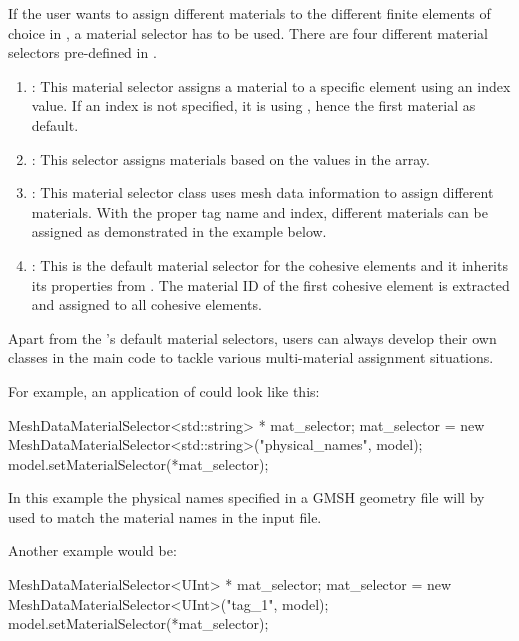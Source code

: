 If the user wants to assign different materials to the different
finite elements of choice in \akantu, a material selector has to be
used. There are four different material selectors pre-defined in
\akantu.

\begin{enumerate}
\item {}: This material selector assigns a
  material to a specific element using an index value. If an index is
  not specified, it is using , hence the first material as
  default.
\item {}: This selector assigns materials
  based on the values in the 
  array.
\item {}: This material selector class
  uses mesh data information to assign different materials. With the
  proper tag name and index, different materials can be assigned as
  demonstrated in the example below.
\item {}: This is the default
  material selector for the cohesive elements and it inherits its
  properties from . The material ID of
  the first cohesive element is extracted and assigned to all cohesive
  elements.
\end{enumerate}

Apart from the \akantu's default material selectors, users can always
develop their own classes in the main code to tackle various
multi-material assignment situations.

For example, an application of  could
look like this:

\begin{cpp}
  MeshDataMaterialSelector<std::string> * mat_selector;
  mat_selector = new MeshDataMaterialSelector<std::string>("physical_names", model);
  model.setMaterialSelector(*mat_selector);
\end{cpp}

In this example the physical names specified in a GMSH geometry file will by
used to match the material names in the input file.

Another example would be:

\begin{cpp}
  MeshDataMaterialSelector<UInt> * mat_selector;
  mat_selector = new MeshDataMaterialSelector<UInt>("tag_1", model);
  model.setMaterialSelector(*mat_selector);
\end{cpp}

